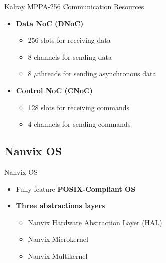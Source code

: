 		\begin{frame}[fragile]{Kalray MPPA-256 Communication Resources}
			\begin{itemize}
				\item \textbf{Data NoC (DNoC)}
				\begin{itemize}
					\item 256 slots for receiving data
					\item 8 channels for sending data
					\item 8 $\mu$threads for sending asynchronous data
				\end{itemize}
			\end{itemize}

			\begin{itemize}
				\item \textbf{Control NoC (CNoC)}
				\begin{itemize}
					\item 128 slots for receiving commands
					\item 4 channels for sending commands
				\end{itemize}
			\end{itemize}

		\end{frame}

	\subsection{Nanvix OS}

		\begin{frame}[fragile]{Nanvix OS}

			\begin{itemize}
				\item Fully-feature \textbf{POSIX-Compliant OS}
			\end{itemize}

			\begin{itemize}
				\item \textbf{Three abstractions layers}
				\begin{itemize}
					\item Nanvix Hardware Abstraction Layer (HAL)
					\item Nanvix Microkernel
					\item Nanvix Multikernel
				\end{itemize}
			\end{itemize}

		\end{frame}

